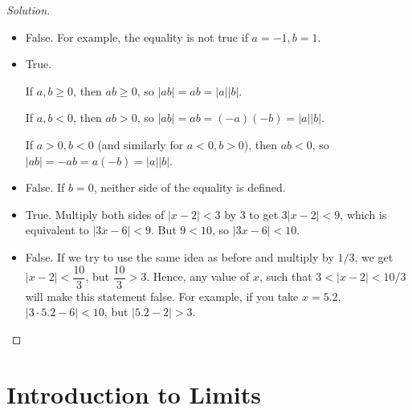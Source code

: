 \documentclass[12pt]{article}
\newenvironment{solution}{\begin{proof}[Solution]}{\end{proof}}
\begin{document}
\begin{enumerate}
				\begin{solution}
					\begin{itemize}
						\item[(a)] False. For example, the equality is not true if $a=-1, b=1$.
						\item[(b)] True. 
						
						If $a,b\geq0$, then $ab\geq0$, so $|ab|=ab=|a||b|$. 
						
						If $a,b<0$, then $ab>0$, so $|ab|=ab=(-a)(-b)=|a||b|$.
						
						If $a>0, b<0$ (and similarly for $a<0,b>0$), then $ab<0$, so $|ab|=-ab=a(-b)=|a||b|$.
						\item[(c)] False. If $b=0$, neither side of the equality is defined.
						\item[(d)] True. Multiply both sides of $|x-2|<3$ by $3$ to get $3|x-2|<9$, which is equivalent to $|3x-6|<9$. But $9<10$, so $|3x-6|<10$.
						\item[(e)] False. If we try to use the same idea as before and multiply by $1/3$, we get $|x-2|<\dfrac{10}{3}$, but $\dfrac{10}{3}>3$. Hence, any value of $x$, such that $3<|x-2|<10/3$ will make this statement false. For example, if you take $x=5.2$, $|3\cdot 5.2-6|<10$, but $|5.2-2|>3$.
					\end{itemize}
				\end{solution}
				
			\end{enumerate}
			
		\newpage
		
		
		\section{Introduction to Limits}
		
\end{document}
